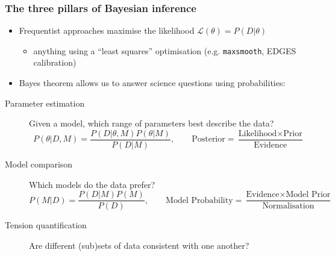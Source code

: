 \documentclass[aspectratio=169]{beamer}
\begin{document}
\begin{frame}
    \frametitle{The three pillars of Bayesian inference}
    \begin{itemize}
        \item Frequentist approaches maximise the likelihood $\mathcal{L}(\theta) = P(D|\theta)$
            \begin{itemize}
                \item anything using a ``least squares'' optimisation (e.g. \texttt{maxsmooth}, EDGES calibration)
            \end{itemize}
        \item Bayes theorem allows us to answer science questions using probabilities:
    \end{itemize}
    \begin{description}
        \item[Parameter estimation] Given a model, which range of parameters best describe the data?
            \[
                P(\theta|D,M) = \frac{P(D|\theta,M) P(\theta|M)}{P(D|M)}, \qquad
                \text{Posterior} = \frac{\text{Likelihood} \times \text{Prior}}{\text{Evidence}}
            \]
        \item[Model comparison] Which models do the data prefer?
            \[
                P(M|D) = \frac{P(D|M) P(M)}{P(D)}, \qquad
                \text{Model Probability} = \frac{\text{Evidence} \times \text{Model Prior}}{\text{Normalisation}}
            \]
        \item[Tension quantification] Are different (sub)sets of data consistent with one another? %
    \end{description}
\end{frame}
\end{document}
